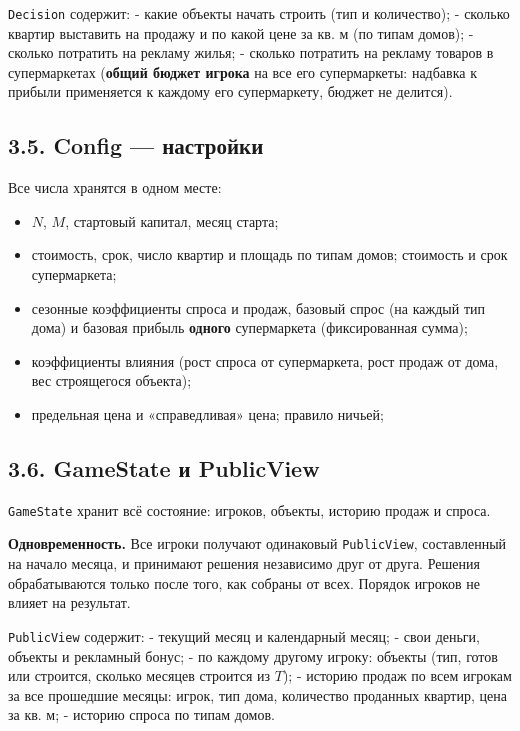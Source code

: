 \documentclass[
]{article}
\providecommand{\tightlist}{%
  \setlength{\itemsep}{0pt}\setlength{\parskip}{0pt}}
\begin{document}
\texttt{Decision} содержит: - какие объекты начать строить (тип и
количество); - сколько квартир выставить на продажу и по какой цене за
кв. м (по типам домов); - сколько потратить на рекламу жилья; - сколько
потратить на рекламу товаров в супермаркетах (\textbf{общий бюджет
игрока} на все его супермаркеты: надбавка к прибыли применяется к
каждому его супермаркету, бюджет не делится).

\subsection{3.5. Config ---
настройки}\label{config-ux43dux430ux441ux442ux440ux43eux439ux43aux438}

Все числа хранятся в одном месте:

\begin{itemize}
\tightlist
\item
  \(N\), \(M\), стартовый капитал, месяц старта;
\item
  стоимость, срок, число квартир и площадь по типам домов; стоимость и
  срок супермаркета;
\item
  сезонные коэффициенты спроса и продаж, базовый спрос (на каждый тип
  дома) и базовая прибыль \textbf{одного} супермаркета (фиксированная
  сумма);
\item
  коэффициенты влияния (рост спроса от супермаркета, рост продаж от
  дома, вес строящегося объекта);
\item
  предельная цена и «справедливая» цена; правило ничьей;

\end{itemize}

\subsection{3.6. GameState и
PublicView}\label{gamestate-ux438-publicview}

\texttt{GameState} хранит всё состояние: игроков, объекты, историю
продаж и спроса.

\textbf{Одновременность.} Все игроки получают одинаковый
\texttt{PublicView}, составленный на начало месяца, и принимают решения
независимо друг от друга. Решения обрабатываются только после того, как
собраны от всех. Порядок игроков не влияет на результат.

\texttt{PublicView} содержит: - текущий месяц и календарный месяц; -
свои деньги, объекты и рекламный бонус; - по каждому другому игроку:
объекты (тип, готов или строится, сколько месяцев строится из \(T\)); -
историю продаж по всем игрокам за все прошедшие месяцы: игрок, тип дома,
количество проданных квартир, цена за кв. м; - историю спроса по типам
домов.
\end{document}
